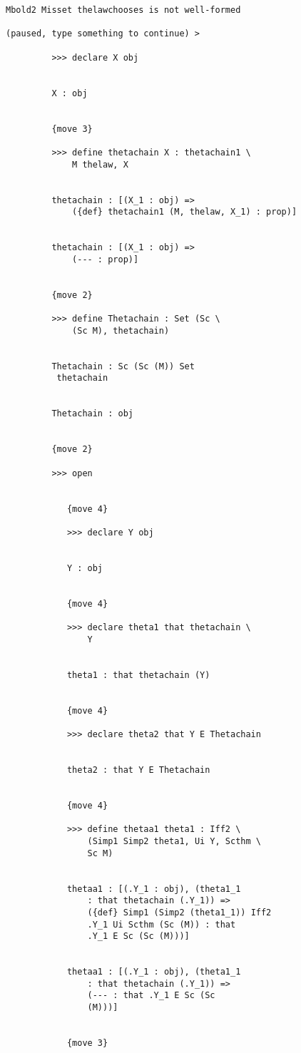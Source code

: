 \documentclass[12pt]{article}
\begin{document}
\begin{verbatim}
Mbold2 Misset thelawchooses is not well-formed

(paused, type something to continue) >

         >>> declare X obj


         X : obj


         {move 3}

         >>> define thetachain X : thetachain1 \
             M thelaw, X


         thetachain : [(X_1 : obj) => 
             ({def} thetachain1 (M, thelaw, X_1) : prop)]


         thetachain : [(X_1 : obj) => 
             (--- : prop)]


         {move 2}

         >>> define Thetachain : Set (Sc \
             (Sc M), thetachain)


         Thetachain : Sc (Sc (M)) Set 
          thetachain


         Thetachain : obj


         {move 2}

         >>> open


            {move 4}

            >>> declare Y obj


            Y : obj


            {move 4}

            >>> declare theta1 that thetachain \
                Y


            theta1 : that thetachain (Y)


            {move 4}

            >>> declare theta2 that Y E Thetachain


            theta2 : that Y E Thetachain


            {move 4}

            >>> define thetaa1 theta1 : Iff2 \
                (Simp1 Simp2 theta1, Ui Y, Scthm \
                Sc M)


            thetaa1 : [(.Y_1 : obj), (theta1_1 
                : that thetachain (.Y_1)) => 
                ({def} Simp1 (Simp2 (theta1_1)) Iff2 
                .Y_1 Ui Scthm (Sc (M)) : that 
                .Y_1 E Sc (Sc (M)))]


            thetaa1 : [(.Y_1 : obj), (theta1_1 
                : that thetachain (.Y_1)) => 
                (--- : that .Y_1 E Sc (Sc 
                (M)))]


            {move 3}


\end{verbatim}
\end{document}
